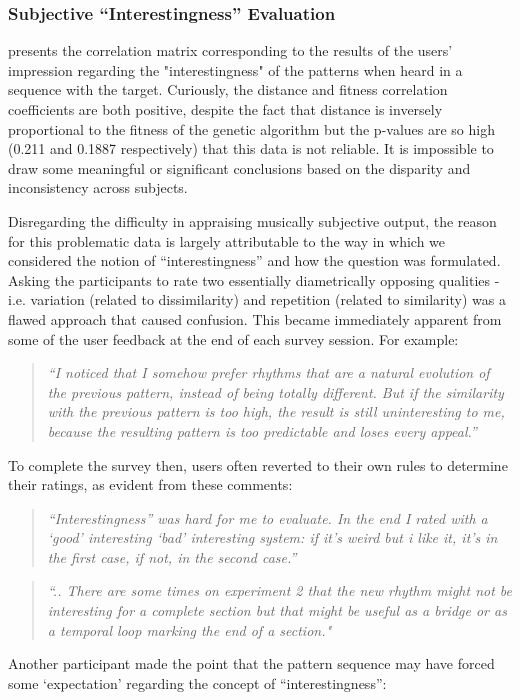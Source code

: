 {{\subsubsection{Subjective “Interestingness” Evaluation}

 presents the correlation matrix corresponding to the results of the users' impression regarding the "interestingness" of the patterns when heard in a sequence with the target. Curiously, the distance and fitness correlation coefficients are both positive, despite the fact that distance is inversely proportional to the fitness of the genetic algorithm but the p-values are so high (0.211 and 0.1887 respectively) that this data is not reliable. It is impossible to draw some meaningful or significant conclusions based on the disparity and inconsistency across subjects.

Disregarding the difficulty in appraising musically subjective output, the reason for this problematic data is largely attributable to the way in which we considered the notion of ``interestingness'' and how the question was formulated. Asking the participants to rate two essentially diametrically opposing qualities - i.e. variation (related to dissimilarity) and repetition (related to similarity) was a flawed approach that caused confusion. This became immediately apparent from some of the user feedback at the end of each survey session. For example:

\blockquote{\textit{“I noticed that I somehow prefer rhythms that are a natural
evolution of the previous pattern, instead of being totally different. But if the similarity with the previous pattern is too high, the result is still uninteresting to me, because the resulting pattern is too predictable and loses every appeal.”}}

To complete the survey then, users often reverted to their own rules to determine their ratings, as evident from these comments:

\blockquote{\textit{“Interestingness” was hard for me to evaluate. In the end I rated with a `good' interesting `bad' interesting system: if it's weird but i like it, it's in the first case, if not, in the second case.''}}

\blockquote{\textit{“.. There are some times on experiment 2 that the new rhythm might not be interesting for a complete section but that might be useful as a bridge or as a temporal loop marking the end of a section."}}

Another participant made the point that the pattern sequence may have forced some `expectation' regarding the concept of “interestingness”:

}}

